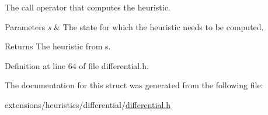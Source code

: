 The call operator that computes the heuristic. 


\begin{DoxyParams}{Parameters}
{\em s} & The state for which the heuristic needs to be computed. \\
\hline
\end{DoxyParams}
\begin{DoxyReturn}{Returns}
The heuristic from {\ttfamily s}. 
\end{DoxyReturn}


Definition at line 64 of file differential.\+h.



The documentation for this struct was generated from the following file\+:\begin{DoxyCompactItemize}
\item 
extensions/heuristics/differential/\hyperlink{differential_8h}{differential.\+h}\end{DoxyCompactItemize}
